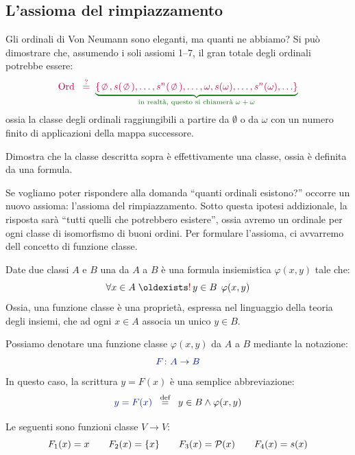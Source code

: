 \subsection{L'assioma del rimpiazzamento}
Gli ordinali di Von Neumann sono eleganti, ma quanti ne abbiamo? Si pu\`o
dimostrare che, assumendo i soli assiomi 1--7, il gran totale degli ordinali potrebbe essere:
\[ \textcolor{purple}{\Ord \;\;\overset{?}{=}}\;\; {\drkgrn
\underbrace{\color{purple}\{\emptyset,
s(\emptyset),\ldots,s^n(\emptyset),\ldots,\omega,s(\omega),\ldots,s^n(\omega),\ldots\}}_{\text{{in realt\`a, questo si chiamer\`a $\omega + \omega$}}}}
	\]
ossia la classe degli ordinali raggiungibili a partire da $\emptyset$ o da $\omega$ con un numero finito di applicazioni della mappa successore.

\begin{exercise}
	Dimostra che la classe descritta sopra \`e effettivamente una classe, ossia \`e definita da una formula.
\end{exercise}

Se vogliamo poter rispondere alla domanda ``quanti ordinali esistono?'' occorre un nuovo assioma: l'assioma del rimpiazzamento. Sotto questa ipotesi addizionale, la risposta sar\`a
``tutti quelli che potrebbero esistere'', ossia avremo un ordinale per ogni classe di isomorfismo di buoni ordini. Per formulare l'assioma, ci avvarremo dell concetto di funzione classe.

\begin{definition}
	Date due classi $A$ e $B$ una  da $A$ a $B$ \`e una formula insiemistica $\varphi(x,y)$ tale che:
	\[ \forall {x \in A} \;\existrun {y \in B} \; \varphi(x,y) \]
{\drkgrn Ossia, una funzione classe \`e una propriet\`a, espressa nel
linguaggio della teoria degli insiemi, che ad ogni $x \in A$ associa un
{\drkred unico} $y \in B$.}
\end{definition}

\begin{notation}
	Possiamo denotare una funzione classe $\varphi(x,y)$ da $A$ a $B$
mediante la notazione:
	\[ \drkblu F \colon A \to B \]
	In questo caso, la scrittura $y = F(x)$ \`e una semplice abbreviazione:
	\[ {\drkblu y = F(x)} \;\;\Mydef\;\; y \in B \land \varphi(x,y)
		\]
\end{notation}

\begin{example}
	Le seguenti sono funzioni classe $V \to V$:
	\[ F_1(x) = x \qquad F_2(x) = \{x\} \qquad F_3(x) = \mathcal{P}(x) \qquad F_4(x) = s(x)
		\]
\end{example}

